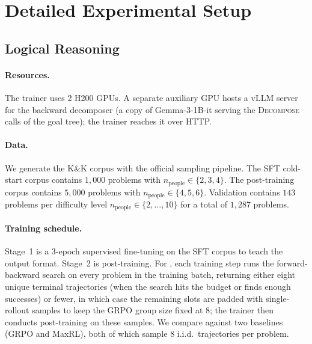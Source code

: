 \section{Detailed Experimental Setup}
\label{app:setup}

\subsection{Logical Reasoning}
\label{app:logical_setup}

\paragraph{Resources.}
The trainer uses 2 H200 GPUs. A separate auxiliary GPU hosts a vLLM
server for the backward decomposer (a copy of Gemma-3-1B-it serving the
\textsc{Decompose} calls of the goal tree); the
trainer reaches it over HTTP.

\paragraph{Data.}
We generate the K\&K corpus with the official sampling pipeline. The SFT
cold-start corpus contains $1{,}000$ problems with $n_\mathrm{people}\in\{2,3,4\}$.
The post-training corpus contains $5{,}000$ problems with
$n_\mathrm{people}\in\{4,5,6\}$.
Validation contains $143$ problems per difficulty level
$n_\mathrm{people}\in\{2,\dots,10\}$ for a total of $1{,}287$ problems.

\paragraph{Training schedule.}
Stage~1 is a 3-epoch supervised fine-tuning on the SFT corpus to teach the
output format. Stage~2 is post-training. For \ours, each training step runs the forward-backward
search on every problem in the training batch, returning either eight
unique terminal trajectories (when the search hits the budget or finds
enough successes) or fewer, in which case the remaining slots are padded
with single-rollout samples to keep the GRPO group size fixed at $8$;
the trainer then conducts post-training on these samples. We compare against two baselines (GRPO and MaxRL),
both of which sample $8$ i.i.d.\ trajectories per problem.


